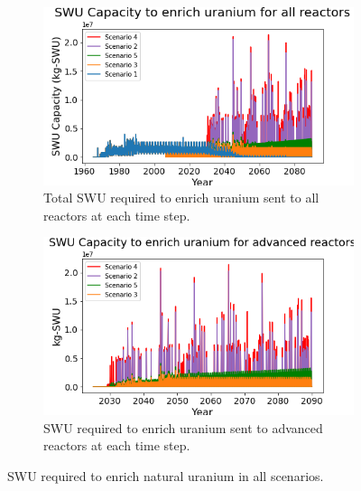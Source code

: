 \begin{figure}
    \centering
    \begin{subfigure}{0.5\textwidth}
        \centering
        \includegraphics[scale=0.5]{../figures/totalswu_scenarios_all.png}
        \caption{Total \gls{SWU} required to enrich uranium sent to all reactors at each time step.}
        \label{fig:totalswu_all}
    \end{subfigure}
    \hspace{0.8cm}
    \begin{subfigure}{0.5\textwidth}
        \centering
        \includegraphics[scale=0.5]{../figures/haleuSWU_scenarios_all.png}
        \caption{\gls{SWU} required to enrich uranium sent to advanced reactors at each time step.}
        \label{fig:haleuswu_al}
    \end{subfigure}
    \caption{\gls{SWU} required to enrich natural uranium in all scenarios.}
    \label{fig:swu_all}
\end{figure}


